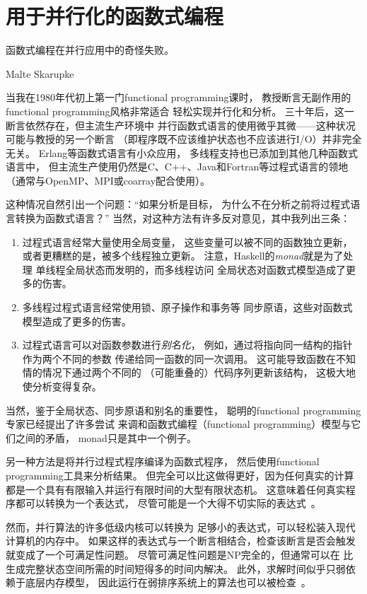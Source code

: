 
\section{用于并行化的函数式编程}
\label{sec:future:Functional Programming for Parallelism}
%
\epigraph{函数式编程在并行应用中的奇怪失败。}
	 {Malte Skarupke}

当我在1980年代初上第一门functional programming课时，
教授断言无副作用的functional programming风格非常适合
轻松实现并行化和分析。
三十年后，这一断言依然存在，但主流生产环境中
并行函数式语言的使用微乎其微——这种状况可能与教授的另一个断言
（即程序既不应该维护状态也不应该进行I/O）并非完全无关。
Erlang等函数式语言有小众应用，
多线程支持也已添加到其他几种函数式语言中，
但主流生产使用仍然是C、C++、Java和Fortran等过程式语言的领地
（通常与OpenMP、MPI或coarray配合使用）。

这种情况自然引出一个问题：``如果分析是目标，
为什么不在分析之前将过程式语言转换为函数式语言？''
当然，对这种方法有许多反对意见，其中我列出三条：

\begin{enumerate}
\item	过程式语言经常大量使用全局变量，
	这些变量可以被不同的函数独立更新，
	或者更糟糕的是，被多个线程独立更新。
	注意，Haskell的\emph{monad}就是为了处理
	单线程全局状态而发明的，而多线程访问
	全局状态对函数式模型造成了更多的伤害。
\item	多线程过程式语言经常使用锁、原子操作和事务等
	同步原语，这些对函数式模型造成了更多的伤害。
\item	过程式语言可以对函数参数进行\emph{别名化}，
	例如，通过将指向同一结构的指针作为两个不同的参数
	传递给同一函数的同一次调用。
	这可能导致函数在不知情的情况下通过两个不同的
	（可能重叠的）代码序列更新该结构，
	这极大地使分析变得复杂。
\end{enumerate}

当然，鉴于全局状态、同步原语和别名的重要性，
聪明的functional programming专家已经提出了许多尝试
来调和函数式编程（functional programming）模型与它们之间的矛盾，
monad只是其中一个例子。

另一种方法是将并行过程式程序编译为函数式程序，
然后使用functional programming工具来分析结果。
但完全可以比这做得更好，因为任何真实的计算
都是一个具有有限输入并运行有限时间的大型有限状态机。
这意味着任何真实程序都可以转换为一个表达式，
尽管可能是一个大得不切实际的表达式~\cite{VijayDSilva2012-sas}。

然而，并行算法的许多低级内核可以转换为
足够小的表达式，可以轻松装入现代计算机的内存中。
如果这样的表达式与一个断言相结合，检查该断言是否会触发
就变成了一个可满足性问题。
尽管可满足性问题是NP完全的，但通常可以在
比生成完整状态空间所需的时间短得多的时间内解决。
此外，求解时间似乎只弱依赖于底层内存模型，
因此运行在弱排序系统上的算法也可以被检查~\cite{JadeAlglave2013-cav}。

